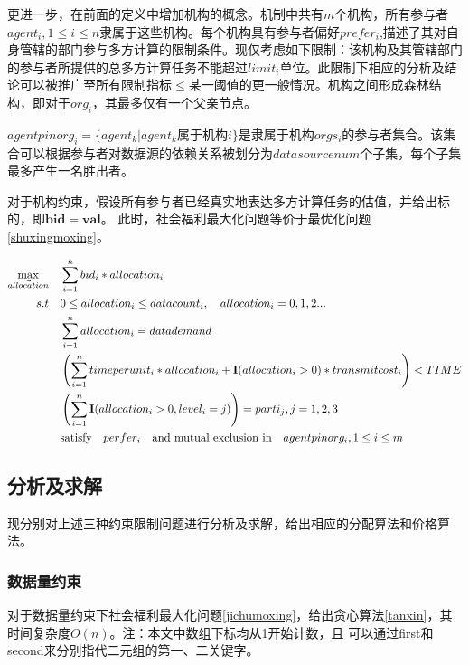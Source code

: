 \documentclass[promaster]{thesis-uestc}
\begin{document}
更进一步，在前面的定义中增加机构的概念。机制中共有$m$个机构，所有参与者$agent_i,1 \leq i \leq n$隶属于这些机构。每个机构具有参与者偏好$prefer_i$,描述了其对自身管辖的部门参与多方计算的限制条件。现仅考虑如下限制：该机构及其管辖部门的参与者所提供的总多方计算任务不能超过$limit_i$单位。此限制下相应的分析及结论可以被推广至所有限制指标$\leq$某一阈值的更一般情况。机构之间形成森林结构，即对于$org_i$，其最多仅有一个父亲节点。

$agentpinorg_i=\{agent_k|agent_k属于机构i\}$是隶属于机构$orgs_i$的参与者集合。该集合可以根据参与者对数据源的依赖关系被划分为$datasourcenum$个子集，每个子集最多产生一名胜出者。

对于机构约束，假设所有参与者已经真实地表达多方计算任务的估值，并给出标的，即$\mathbf{bid} = \mathbf{val}$。 此时，社会福利最大化问题等价于最优化问题\ref{shuxingmoxing}。

\begin{align}
    \label{shuxingmoxing}\max_{\vec{allocation}} \quad&\sum_{i=1}^{n}{bid_i*allocation_i}\\
    s.t\quad& 0\leq allocation_i\leq datacount_i,\quad allocation_i = {0,1,2...}\notag\\
        \quad& \sum_{i=1}^{n}{allocation_i} = datademand\notag\\
        \quad& \left(\sum_{i=1}^{n}{timeperunit_i*allocation_i+\mathbf{I}(allocation_i > 0)*transmitcost_i}\right) < TIME\notag\\
        \quad& \left(\sum_{i=1}^{n}{\mathbf{I}(allocation_i > 0,level_i = j)}\right)=parti_j, j = {1,2,3}\notag\\
        \quad& \text{satisfy}\quad perfer_i \quad \text{and mutual exclusion in}\quad agentpinorg_i, 1\leq i\leq m \notag
\end{align}

\FloatBarrier

\subsection{分析及求解}
现分别对上述三种约束限制问题进行分析及求解，给出相应的分配算法和价格算法。

\subsubsection{数据量约束}

对于数据量约束下社会福利最大化问题\ref{jichumoxing}，给出贪心算法\ref{tanxin}，其时间复杂度$O(n)$。注：本文中数组下标均从1开始计数，且
可以通过first和second来分别指代二元组的第一、二关键字。
\end{document}
